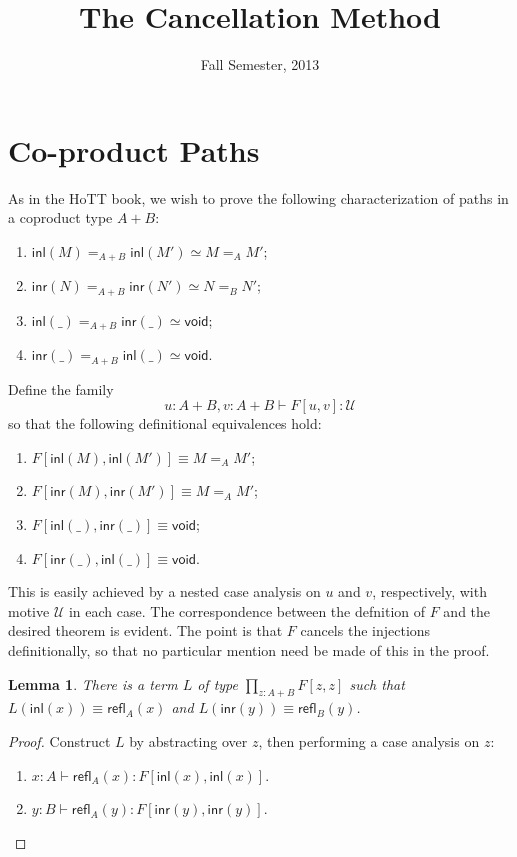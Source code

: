 \documentclass{article}
\title{The Cancellation Method}
\date{Fall Semester, 2013}
\newcommand{\zeroty}{\mathsf{void}}
\newcommand{\sumty}[2]{{#1}+{#2}}
\newcommand{\inleft}[1]{\mathsf{inl}(#1)}
\newcommand{\inright}[1]{\mathsf{inr}{(#1)}}
\newcommand{\idty}[3]{{#2}\mathbin{=_{#1}}{#3}}
\newcommand{\refl}[2]{\mathsf{refl}_{#1}({#2})}
\newcommand{\prodty}[3]{\prod_{{#1}{:}{#2}}{#3}}
\newcommand{\app}[2]{{#1}({#2})}
\newcommand{\univty}{\mathcal{U}}
\newtheorem{lemma}[theorem]{Lemma}
\begin{document}
\maketitle{}

\section{Co-product Paths}

As in the HoTT book, we wish to prove the following characterization of paths in a coproduct type $A+B$:
\begin{enumerate}
\item $\idty{\sumty{A}{B}}{\inleft{M}}{\inleft{M'}} \simeq \idty{A}{M}{M'}$;
\item $\idty{\sumty{A}{B}}{\inright{N}}{\inright{N'}} \simeq \idty{B}{N}{N'}$;
\item $\idty{\sumty{A}{B}}{\inleft{\_}}{\inright{\_}} \simeq \zeroty$;
\item $\idty{\sumty{A}{B}}{\inright{\_}}{\inleft{\_}} \simeq \zeroty$.
\end{enumerate}

Define the family $$u:\sumty{A}{B},v:\sumty{A}{B}\vdash F[u,v]:\univty$$ so that the following definitional equivalences hold:
\begin{enumerate}
\item $F[\inleft{M},\inleft{M'}]\equiv \idty{A}{M}{M'}$;
\item $F[\inright{M},\inright{M'}]\equiv \idty{A}{M}{M'}$;
\item $F[\inleft{\_},\inright{\_}]\equiv\zeroty$;
\item $F[\inright{\_},\inleft{\_}]\equiv\zeroty$.
\end{enumerate}
This is easily achieved by a nested case analysis on $u$ and $v$, respectively, with motive $\univty$ in each case.  The correspondence between the defnition of $F$ and the desired theorem is evident.  The point is that $F$ cancels the injections definitionally, so that no particular mention need be made of this in the proof.

\begin{lemma}
  \label{L-lemma}
  There is a term $L$ of type $\prodty{z}{\sumty{A}{B}}{F[z,z]}$ such that $\app{L}{\inleft{x}}\equiv \refl{A}{x}$ and $\app{L}{\inright{y}}\equiv \refl{B}{y}$.
\end{lemma}
\begin{proof}
  Construct $L$ by abstracting over $z$, then performing a case analysis on $z$:
  \begin{enumerate}
  \item $x:A\vdash \refl{A}{x}:F[\inleft{x},\inleft{x}]$.
  \item $y:B\vdash \refl{A}{y}:F[\inright{y},\inright{y}]$.
  \end{enumerate}
\end{proof}
\end{document}
